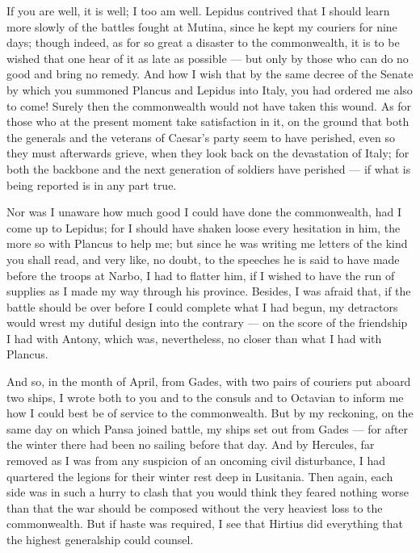 

 If you are well, it is well; I too am well. Lepidus contrived that I should learn more slowly of the battles fought at Mutina, since he kept my couriers for nine days; though indeed, as for so great a disaster to the commonwealth, it is to be wished that one hear of it as late as possible --- but only by those who can do no good and bring no remedy. And how I wish that by the same decree of the Senate by which you summoned Plancus and Lepidus into Italy, you had ordered me also to come! Surely then the commonwealth would not have taken this wound. As for those who at the present moment take satisfaction in it, on the ground that both the generals and the veterans of Caesar's party seem to have perished, even so they must afterwards grieve, when they look back on the devastation of Italy; for both the backbone and the next generation of soldiers have perished --- if what is being reported is in any part true.

 Nor was I unaware how much good I could have done the commonwealth, had I come up to Lepidus; for I should have shaken loose every hesitation in him, the more so with Plancus to help me; but since he was writing me letters of the kind you shall read, and very like, no doubt, to the speeches he is said to have made before the troops at Narbo, I had to flatter him, if I wished to have the run of supplies as I made my way through his province. Besides, I was afraid that, if the battle should be over before I could complete what I had begun, my detractors would wrest my dutiful design into the contrary --- on the score of the friendship I had with Antony, which was, nevertheless, no closer than what I had with Plancus.

 And so, in the month of April, from Gades, with two pairs of couriers put aboard two ships, I wrote both to you and to the consuls and to Octavian to inform me how I could best be of service to the commonwealth. But by my reckoning, on the same day on which Pansa joined battle, my ships set out from Gades --- for after the winter there had been no sailing before that day. And by Hercules, far removed as I was from any suspicion of an oncoming civil disturbance, I had quartered the legions for their winter rest deep in Lusitania. Then again, each side was in such a hurry to clash that you would think they feared nothing worse than that the war should be composed without the very heaviest loss to the commonwealth. But if haste was required, I see that Hirtius did everything that the highest generalship could counsel.


